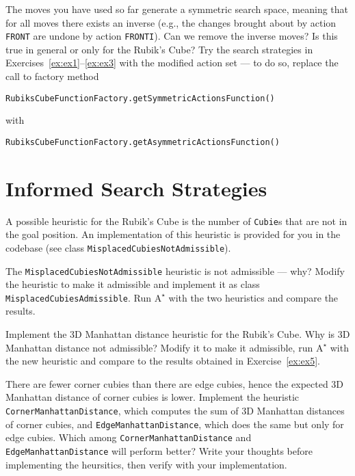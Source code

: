 \documentclass[a4paper]{article}
\begin{document}
{\ex{}\label{ex:ex4} The moves you have used so far generate a symmetric search space, meaning that for all moves there exists an inverse (e.g., the changes brought about by action {\tt FRONT} are undone by action {\tt FRONTI}).  Can we remove the inverse moves? Is this true in general or only for the Rubik's Cube? Try the search strategies in Exercises~\ref{ex:ex1}--\ref{ex:ex3} with the modified action set --- to do so, replace the call to factory method
\begin{lstlisting}
RubiksCubeFunctionFactory.getSymmetricActionsFunction()
\end{lstlisting}
with
\begin{lstlisting}
RubiksCubeFunctionFactory.getAsymmetricActionsFunction()
\end{lstlisting}
\vspace{0.1cm}}


\section{Informed Search Strategies}
A possible heuristic for the Rubik's Cube is the number of {\tt Cubie}s that are not in the goal position.  An implementation of this heuristic is provided for you in the codebase (see class {\tt MisplacedCubiesNotAdmissible}).

{\ex{}\label{ex:ex5} The {\tt MisplacedCubiesNotAdmissible} heuristic is not admissible --- why?  Modify the heuristic to make it admissible and implement it as class {\tt MisplacedCubiesAdmissible}. Run $\text{A}^\star$ with the two heuristics and compare the results.\vspace{0.1cm}}


{\ex{}\label{ex:ex7} Implement the 3D Manhattan distance heuristic for the Rubik's Cube.  Why is 3D Manhattan distance not admissible?  Modify it to make it admissible, run $\text{A}^\star$ with the new heuristic and compare to the results obtained in Exercise~\ref{ex:ex5}.\vspace{0.1cm}}

{\ex{}\label{ex:ex8} There are fewer corner cubies than there are edge cubies, hence the expected 3D Manhattan distance of corner cubies is lower.  Implement the heuristic {\tt CornerManhattanDistance}, which computes the sum of 3D Manhattan distances of corner cubies, and {\tt EdgeManhattanDistance}, which does the same but only for edge cubies.
Which among {\tt CornerManhattanDistance} and {\tt EdgeManhattanDistance} will perform better?  Write your thoughts before implementing the heursitics, then verify with your implementation.\vspace{0.1cm}}
\end{document}
